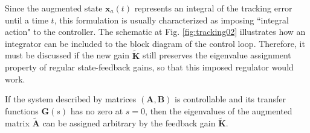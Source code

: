 \documentclass[a4paper,11pt]{book}
\numberwithin{figure}{chapter}
\numberwithin{equation}{chapter}
\numberwithin{table}{chapter}
\newtheorem{theorem}{Theorem}[chapter]
\theoremstyle{definition}
\newcounter{boxed-theorem}
\newenvironment{boxed-theorem}[1]
{\begin{shaded} \begin{theorem}{#1}}
{\end{theorem} \end{shaded}}
\newcounter{boxed-definition}
\begin{document}
Since the augmented state $\bm{x}_a(t)$ represents an integral of the tracking error until a time $t$, this formulation is usually characterized as imposing ``integral action" to the controller. The schematic at Fig. \ref{fig:tracking02} illustrates how an integrator can be included to the block diagram of the control loop. Therefore, it must be discussed if the new gain $\tilde{\bm{K}}$ still preserves the eigenvalue assignment property of regular state-feedback gains, so that this imposed regulator would work.

\begin{boxed-theorem}
    If the system described by matrices $(\bm{A}, \bm{B})$ is controllable and its transfer functions $\bm{G}(s)$ has no zero at $s = 0$, then the eigenvalues of the augmented matrix $\tilde{\bm{A}}$ can be assigned arbitrary by the feedback gain $\tilde{\bm{K}}$.
\end{boxed-theorem}
\end{document}
